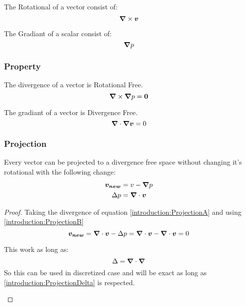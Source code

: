 \begin{definition}
 The Rotational of a vector consist of:
 \begin{equation}
  {\boldsymbol {\nabla}} \times {\boldsymbol {v}}
 \end{equation}
\end{definition}

\begin{definition}
 The Gradiant of a scalar consist of:
 \begin{equation}
  {\boldsymbol {\nabla}} p
 \end{equation}
\end{definition}

\subsubsection{Property}

\begin{property}
 The divergence of a vector is Rotational Free.
 \begin{equation}
  {\boldsymbol {\nabla}}\times {\boldsymbol {\nabla}} p={\boldsymbol {0}}
 \end{equation}
\end{property}

\begin{property}
 The gradiant of a vector is Divergence Free.
 \begin{equation}
  {\boldsymbol {\nabla}}\cdot {\boldsymbol {\nabla}} {\boldsymbol {v}}=0
 \end{equation}
\end{property}
\subsubsection{Projection}

\label{introduction:projection}
\begin{property}
 Every vector can be projected to a divergence free space without changing it's rotational with the following change:
\begin{align}
 {\boldsymbol {v_{new}}}&=v-{\boldsymbol {\nabla}}p \label{introduction:ProjectionA}\\
 \Delta p&={\boldsymbol {\nabla}} \cdot {\boldsymbol {v}} \label{introduction:ProjectionB}
\end{align}
\end{property}
\begin{proof}
  Taking the divergence of equation \ref{introduction:ProjectionA} and using \ref{introduction:ProjectionB}
  \begin{equation}
   {\boldsymbol {v_{new}}}={\boldsymbol {\nabla}}\cdot{\boldsymbol {v}}-\Delta p={\boldsymbol {\nabla}}\cdot{\boldsymbol {v}}-{\boldsymbol {\nabla}}\cdot{\boldsymbol {v}}=0
  \end{equation}
  \begin{rem}
 This work as long as:
 \begin{equation}
  \Delta={\boldsymbol {\nabla}}\cdot {\boldsymbol {\nabla}}\label{introduction:ProjectionDelta}
 \end{equation}
 So this can be used in discretized case and will be exact as long as \ref{introduction:ProjectionDelta} is respected.
 \end{rem}
\end{proof}

